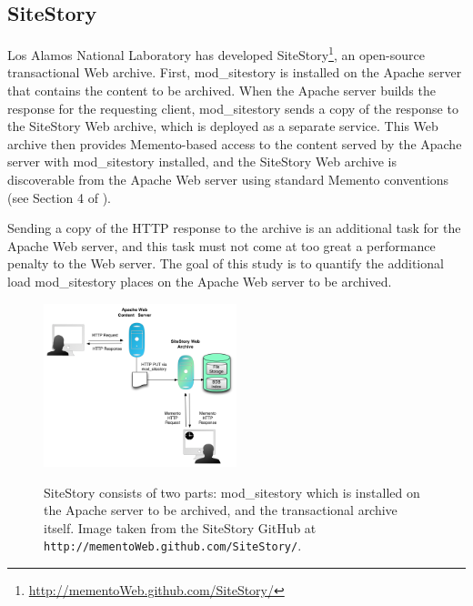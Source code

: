 \documentclass[runningheads,a4paper]{llncs}
\begin{document}
\subsection{SiteStory}
\vskip -3mm
\sloppy Los Alamos National Laboratory has developed SiteStory\footnote{\url{http://mementoWeb.github.com/SiteStory/}}, an open-source transactional Web archive.  
First, mod\_sitestory is installed on the Apache server that contains the content to be archived.  When the Apache server builds the response for the requesting client, mod\_sitestory sends a copy of the response to the SiteStory Web archive, which is deployed as a separate service.  This Web archive then provides Memento-based access to the content served by the Apache server with mod\_sitestory installed, and the SiteStory Web archive is discoverable from the Apache Web server using standard Memento conventions (see Section 4 of \cite{memento:rfc}).

Sending a copy of the HTTP response to the archive is an additional task for the Apache Web server, and this task must not come at too great a performance penalty to the Web server.  The goal of this study is to quantify the additional load mod\_sitestory places on the Apache Web server to be archived.\fussy


\begin{figure}[t]
\begin{center}
\includegraphics[width=0.5\textwidth]{twa_sitestory.png}
\caption{SiteStory consists of two parts: mod\_sitestory which is installed on the Apache server to be archived, and the transactional archive itself.  Image taken from the SiteStory GitHub at \texttt{http://mementoWeb.github.com/SiteStory/}.}
\vskip -3mm
\label{twa}
\end{center}
\end{figure}



\end{document}
